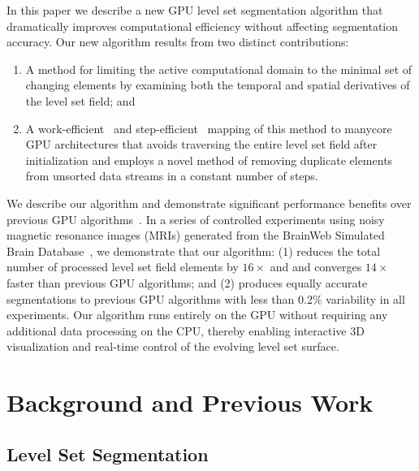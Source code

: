 \documentclass{egpubl}
\begin{document}
In this paper we describe a new GPU level set segmentation algorithm that dramatically improves computational efficiency without affecting segmentation accuracy. Our new algorithm results from two distinct contributions:

\begin{enumerate}

    \item A method for limiting the active computational domain to the minimal set of changing elements by examining both the temporal and spatial derivatives of the level set field; and

    \item A work-efficient~\cite{Atallah-1998} and step-efficient~\cite{Nyland-2000} mapping of this method to manycore GPU architectures that avoids traversing the entire level set field after initialization and employs a novel method of removing duplicate elements from unsorted data streams in a constant number of steps.

\end{enumerate}

We describe our algorithm and demonstrate significant performance benefits over previous GPU algorithms~\cite{Lefohn-2003-MICCAI,Lefohn-2003-Vis,Cates-2004,Lefohn-2004}. In a series of controlled experiments using noisy magnetic resonance images (MRIs) generated from the BrainWeb Simulated Brain Database~\cite{BrainWeb-2010,Kwan-1996,Cocosco-1997,Collins-1998,Kwan-1999}, we demonstrate that our algorithm: (1) reduces the total number of processed level set field elements by $16 \times$ and and converges $14 \times$ faster than previous GPU algorithms; and (2) produces equally accurate segmentations to previous GPU algorithms with less than 0.2\% variability in all experiments. Our algorithm runs entirely on the GPU without requiring any additional data processing on the CPU, thereby enabling interactive 3D visualization and real-time control of the evolving level set surface.


\section{Background and Previous Work}
\label{sec:backgroundAndPreviousWork}

\subsection{Level Set Segmentation}
\end{document}
